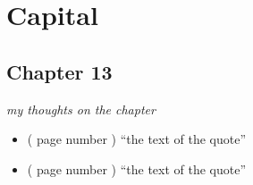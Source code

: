 \documentclass[a4paper,12pt]{article}
\begin{document}
\section{Capital}

\subsection{Chapter 13}
\textit{my thoughts on the chapter}

\begin{itemize}
\item
( page number ) ``the text of the quote''


\item
( page number ) ``the text of the quote''

\end{itemize}
\end{document}

